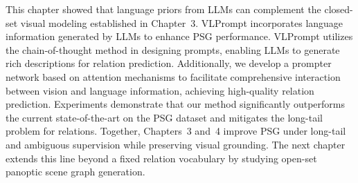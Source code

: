 This chapter showed that language priors from LLMs can complement the closed-set visual modeling established in Chapter~3.
VLPrompt incorporates language information generated by LLMs to enhance PSG performance.
VLPrompt utilizes the chain-of-thought method in designing prompts, enabling LLMs to generate rich descriptions for relation prediction. 
Additionally, we develop a prompter network based on attention mechanisms to facilitate comprehensive interaction between vision and language information, achieving high-quality relation prediction.
Experiments demonstrate that our method significantly outperforms the current state-of-the-art on the PSG dataset and mitigates the long-tail problem for relations.
Together, Chapters~3 and~4 improve PSG under long-tail and ambiguous supervision while preserving visual grounding.
The next chapter extends this line beyond a fixed relation vocabulary by studying open-set panoptic scene graph generation.

